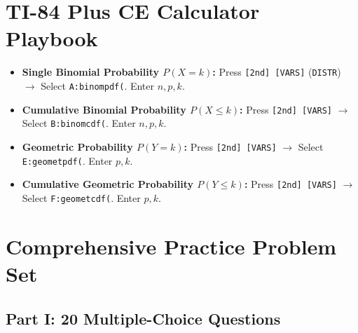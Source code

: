 \section{TI-84 Plus CE Calculator Playbook}

\begin{calculatorbox}
\begin{itemize}[leftmargin=1.2em]
  \item \textbf{Single Binomial Probability $P(X = k)$:} Press \texttt{[2nd] [VARS]} (\texttt{DISTR}) $\rightarrow$ Select \texttt{A:binompdf(}. Enter $n, p, k$.
  \item \textbf{Cumulative Binomial Probability $P(X \le k)$:} Press \texttt{[2nd] [VARS]} $\rightarrow$ Select \texttt{B:binomcdf(}. Enter $n, p, k$.
  \item \textbf{Geometric Probability $P(Y = k)$:} Press \texttt{[2nd] [VARS]} $\rightarrow$ Select \texttt{E:geometpdf(}. Enter $p, k$.
  \item \textbf{Cumulative Geometric Probability $P(Y \le k)$:} Press \texttt{[2nd] [VARS]} $\rightarrow$ Select \texttt{F:geometcdf(}. Enter $p, k$.
\end{itemize}
\end{calculatorbox}

\section{Comprehensive Practice Problem Set}

\subsection*{Part I: 20 Multiple-Choice Questions}

